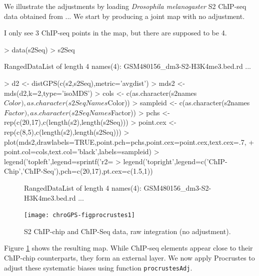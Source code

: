 \documentclass[a4paper,12pt,nogin]{article}
\newcommand{\newtext}[1]{{\color{blue} #1}} %
\newcommand{\drcomment}[1]{{\color{red} #1}} %
\begin{document}
\newtext{We illustrate the adjustments by loading {\it Drosophila melanogaster} S2 ChIP-seq data obtained from} \drcomment{...}
\newtext{We start by producing a joint map with no adjustment.}

\drcomment{I only see 3 ChIP-seq points in the map, but there are supposed to be 4.}

\footnotesize
 
\begin{Schunk}
\begin{Sinput}
> data(s2Seq)
> s2Seq
\end{Sinput}
\begin{Soutput}
RangedDataList of length 4
names(4): GSM480156_dm3-S2-H3K4me3.bed.rd ...
\end{Soutput}
\begin{Sinput}
> d2 <- distGPS(c(s2,s2Seq),metric='avgdist')
> mds2 <- mds(d2,k=2,type='isoMDS')
> cols <- c(as.character(s2names$Color),as.character(s2SeqNames$Color))
> sampleid <- c(as.character(s2names$Factor),as.character(s2SeqNames$Factor))
> pchs <- rep(c(20,17),c(length(s2),length(s2Seq)))
> point.cex <- rep(c(8,5),c(length(s2),length(s2Seq)))
> plot(mds2,drawlabels=TRUE,point.pch=pchs,point.cex=point.cex,text.cex=.7,
+ point.col=cols,text.col='black',labels=sampleid)
> legend('topleft',legend=sprintf('r2=%
> legend('topright',legend=c('ChIP-Chip','ChIP-Seq'),pch=c(20,17),pt.cex=c(1.5,1))
\end{Sinput}
\end{Schunk}
 
\normalsize
 
\begin{figure}
\begin{center}
\begin{Schunk}
\begin{Soutput}
RangedDataList of length 4
names(4): GSM480156_dm3-S2-H3K4me3.bed.rd ...
\end{Soutput}
\end{Schunk}
\texttt{[image: chroGPS-figprocrustes1]}
\end{center}
\caption{S2 ChIP-chip and ChIP-Seq data, raw integration (no adjustment). }
\label{fig:procrustes1}
\end{figure}

\newtext{
Figure \ref{fig:procrustes1} shows the resulting map.
While ChIP-seq elements appear close to their ChIP-chip counterparts, they form an external layer.
We now apply Procrustes to adjust these systematic biases using function \texttt{procrustesAdj}.
}
\end{document}
